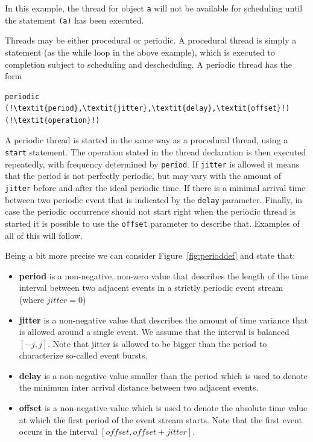 \documentclass{overturerepchap}
\begin{document}
In this example, the thread for object \texttt{a} will not be available for
scheduling until the statement {\bf{}}\texttt{(a)} 
has been executed.

Threads may be either procedural or periodic. A procedural thread is
simply a statement (as the while loop in the above example), which is
executed to completion subject to scheduling and descheduling. A
periodic thread has the form

\begin{lstlisting}
periodic (!\textit{period},\textit{jitter},\textit{delay},\textit{offset}!) (!\textit{operation}!)
\end{lstlisting}

A periodic thread is started in the same way as a procedural thread,
using a \texttt{start} statement. The operation stated in the thread
declaration is then executed repeatedly, with frequency determined by
\texttt{period}. If \texttt{jitter} is allowed it means that the period 
is not perfectly periodic, but may vary with the amount of
\texttt{jitter} before and after the ideal periodic time. If there is
a minimal arrival time between two periodic event that is indicated by
the \texttt{delay} parameter. Finally, in case the periodic occurrence
should not start right when the periodic thread is started it is
possible to use the \texttt{offset} parameter to describe
that. Examples of all of this will follow.

Being a bit more precise we can consider Figure~\ref{fig:perioddef} and
state that:
\begin{itemize}
\item \textbf{period} is a non-negative, non-zero value
that describes the length of the time interval between
two adjacent events in a strictly periodic event stream
(where $jitter=0$)
\item \textbf{jitter} is a non-negative value that describes
the amount of time variance that is allowed around a single
event. We assume that the interval is balanced $[-j,j]$.
Note that jitter is allowed to be bigger than the period
to characterize so-called event bursts.
\item \textbf{delay} is a non-negative value smaller than
the period which is used to denote the minimum inter arrival
distance between two adjacent events.
\item \textbf{offset} is a non-negative value which is used
to denote the absolute time value at which the first period
of the event stream starts. Note that the first event
occurs in the interval $[offset,offset + jitter]$.
\end{itemize}
\end{document}
